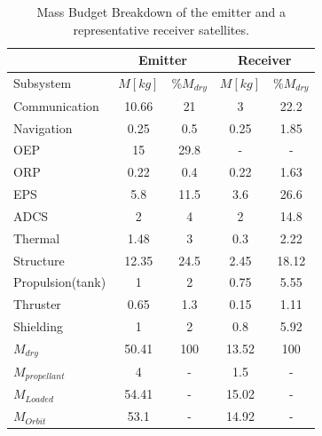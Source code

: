 \begin{table}[h!]
\centering
\begin{tabular}{|l|c|c|c|c|}
\hline
 & \multicolumn{2}{|c|}{Emitter} & \multicolumn{2}{|c|}{Receiver} \\\hline
 Subsystem        & $M [kg]$ & \%$M_{dry}$ & $M [kg]$ & \%$M_{dry}$ \\\hline\hline
 Communication    & 10.66    & 21          & 3        & 22.2 \\\hline
 Navigation       & 0.25     & 0.5         & 0.25     & 1.85 \\\hline
 OEP              & 15       & 29.8        & -        & - \\\hline
 ORP              & 0.22     & 0.4         & 0.22     & 1.63 \\\hline
 EPS              & 5.8      & 11.5        & 3.6      & 26.6 \\\hline
 ADCS             & 2        & 4           & 2        & 14.8 \\\hline
 Thermal          & 1.48     & 3           & 0.3      & 2.22 \\\hline
 Structure        & 12.35    & 24.5        & 2.45     & 18.12 \\\hline
 Propulsion(tank) & 1        & 2           & 0.75     & 5.55 \\\hline
 Thruster         & 0.65     & 1.3         & 0.15     & 1.11 \\\hline
 Shielding        & 1        & 2           & 0.8      & 5.92 \\\hline\hline
 $M_{dry}$        & 50.41    & 100         & 13.52    & 100 \\\hline
 $M_{propellant}$ & 4        & -           & 1.5      & - \\\hline
 $M_{Loaded}$     & 54.41    & -           & 15.02    & - \\\hline
 $M_{Orbit}$      & 53.1     & -           & 14.92    & - \\\hline
\end{tabular}
\caption{Mass Budget Breakdown of the emitter and a representative receiver satellites.}
\label{tab:MB}
\end{table}

